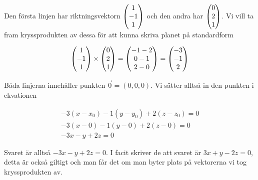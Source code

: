 \documentclass[../../main.tex]{subfiles}
\begin{document}
\begin{solution}{17}

Den första linjen har riktningsvektorn $\begin{pmatrix}1\\-1\\1\end{pmatrix}$ och den andra har $\begin{pmatrix}0\\2\\1\end{pmatrix}$. Vi vill ta fram kryssprodukten av dessa för att kunna skriva planet på standardform

$$
\begin{pmatrix}1\\-1\\1\end{pmatrix} \times \begin{pmatrix}0\\2\\1\end{pmatrix} = \begin{pmatrix}-1-2\\0-1\\2-0\end{pmatrix} = \begin{pmatrix}-3\\-1\\2\end{pmatrix}
$$

Båda linjerna innehåller punkten $\Vec{0} = (0,0,0)$. Vi sätter alltså in den punkten i ekvationen

\begin{align*}
-3(x - x_0) -1(y - y_0) +2(z-z_0) = 0\\
-3(x-0) -1(y-0) +2(z-0) = 0\\
-3x -y +2z = 0
\end{align*}

Svaret är alltså $-3x -y +2z = 0$. I facit skriver de att svaret är $3x + y - 2z = 0$, detta är också giltigt och man får det om man byter plats på vektorerna vi tog kryssprodukten av.

\end{solution}
\end{document}
